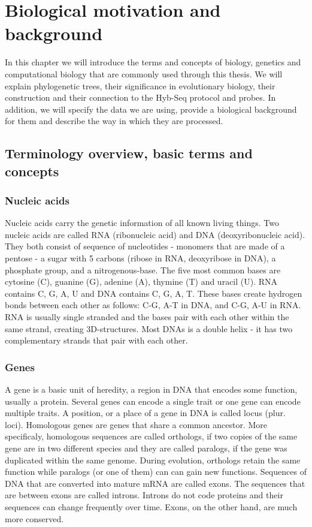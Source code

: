\chapter[Biological motivation]{Biological motivation and background}
\label{kap:biological_motivation}

In this chapter we will introduce the terms and concepts of biology, genetics and computational biology that 
are commonly used through this thesis. 
We will explain phylogenetic trees, their significance in evolutionary biology, their construction and 
their connection to the Hyb-Seq protocol and probes. In addition, we will specify the data we are using, provide 
a biological background for them and describe the way in which they are processed. 

\section{Terminology overview, basic terms and concepts}

\subsection{Nucleic acids}
Nucleic acids carry the genetic information of all known living things. Two nucleic acids are called RNA 
(ribonucleic acid) and DNA (deoxyribonucleic acid). They both consist of sequence of nucleotides 
- monomers that are made of a pentose - a sugar with 5 carbons (ribose in RNA, deoxyribose in DNA), a 
phosphate group, and a nitrogenous-base. The five most common bases are cytosine (C), guanine (G), 
adenine (A), thymine (T) and uracil (U). RNA contains C, G, A, U and DNA contains C, G, A, T. These bases 
create hydrogen bonds between each other as follows: C-G, A-T in DNA, and C-G, A-U in RNA. 
RNA is usually single stranded and the bases pair with each other within the same strand, creating 3D-structures. 
Most DNAs is a double helix - it has two complementary strands that pair with each other. 

\subsection{Genes}
A gene is a basic unit of heredity, a region in DNA that encodes some function, usually a protein. Several genes 
can encode a single trait or one gene can encode multiple traits. A position, or a place of a gene in DNA is called 
locus (plur. loci). Homologous genes are genes that share a common ancestor. More specificaly, homologous sequences are 
called orthologs, if two copies of the same gene are in two different species and they are called paralogs, if the gene was 
duplicated within the same genome. During evolution, orthologs retain the same function while paralogs (or one of them) can 
can gain new functions. 
Sequences of DNA that are converted into mature mRNA are called exons. The sequences that are between exons are called introns. 
Introns do not code proteins and their sequences can change frequently over time. Exons, on the other hand, are much more 
conserved. 


